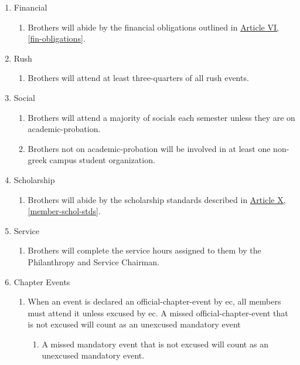 	\begin{enumerate}
		\item Financial
			\begin{enumerate}
				\item Brothers will abide by the financial obligations outlined in \hyperref[fin-obligations]{Article VI, \autoref*{fin-obligations}}.
			\end{enumerate}

		\item Rush
			\begin{enumerate}
				\label{rush-attend-std}
				\item Brothers will \gls{attend} at least three-quarters of all rush events.
			\end{enumerate}

		\item Social
			\begin{enumerate}
				\item Brothers will \gls{attend} a majority of \glspl{social} each semester unless they are on \gls{academic-probation}.
				\item Brothers not on \gls{academic-probation} will be involved in at least one non-greek campus student organization.
			\end{enumerate}

		\item Scholarship
			\begin{enumerate}
				\item Brothers will abide by the scholarship standards described in \hyperref[member-schol-stds]{Article X, \autoref*{member-schol-stds}}.
			\end{enumerate}

		\item Service
			\begin{enumerate}
				\item Brothers will complete the service hours assigned to them by the Philanthropy and Service Chairman.
			\end{enumerate}

		\item Chapter Events
			\begin{enumerate}
				\item When an event is declared an \gls{official-chapter-event} by \gls{ec}, all members must \gls{attend} it unless excused by \gls{ec}. A missed \gls{official-chapter-event} that is not excused will count as an unexcused mandatory event
					\begin{enumerate}
						\item A missed mandatory event that is not excused will count as an unexcused mandatory event.


\end{enumerate}
\end{enumerate}
\end{enumerate}
